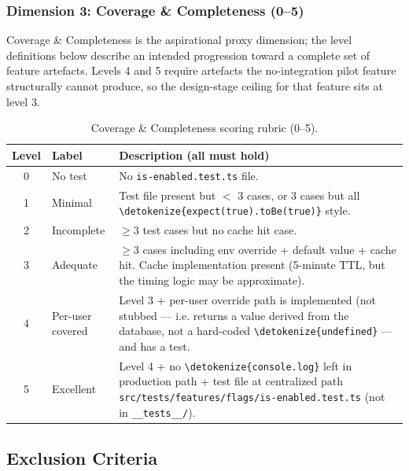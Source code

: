 \documentclass[12pt,a4paper]{report}
\newcommand{\code}[1]{\texttt{\nolinkurl{\detokenize{#1}}}}
\DeclareRobustCommand{\filename}[1]{\bgroup\urlstyle{tt}\nolinkurl{#1}\egroup}
\begin{document}
\subsubsection{Dimension 3: Coverage \& Completeness (0--5)}

Coverage \& Completeness is the aspirational proxy dimension; the level definitions below describe an intended progression toward a complete set of feature artefacts. Levels 4 and 5 require artefacts the no-integration pilot feature structurally cannot produce, so the design-stage ceiling for that feature sits at level 3.

\begin{table}[H]
\centering
\begin{tabular}{clp{9cm}}
\toprule
\textbf{Level} & \textbf{Label} & \textbf{Description (all must hold)} \\
\midrule
0 & No test & No \filename{is-enabled.test.ts} file. \\
1 & Minimal & Test file present but $<$ 3 cases, or 3 cases but all \code{expect(true).toBe(true)} style. \\
2 & Incomplete & $\geq 3$ test cases but no cache hit case. \\
3 & Adequate & $\geq 3$ cases including env override + default value + cache hit. Cache implementation present (5-minute TTL, but the timing logic may be approximate). \\
4 & Per-user covered & Level 3 + per-user override path is implemented (not stubbed --- i.e. returns a value derived from the database, not a hard-coded \code{undefined} --- and has a test. \\
5 & Excellent & Level 4 + no \code{console.log} left in production path + test file at centralized path \filename{src/tests/features/flags/is-enabled.test.ts} (not in \filename{\_\_tests\_\_/}). \\
\bottomrule
\end{tabular}
\caption{Coverage \& Completeness scoring rubric (0--5).}
\label{tab:rubric-cov}
\end{table}

\subsection{Exclusion Criteria}
\label{sec:pilot-exclusion}
\end{document}
